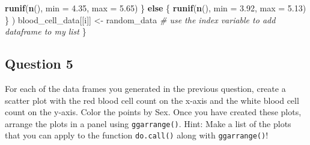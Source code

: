 \documentclass[
]{article}
\newenvironment{Shaded}{\begin{snugshade}}{\end{snugshade}}
\newcommand{\AttributeTok}[1]{\textcolor[rgb]{0.13,0.29,0.53}{#1}}
\newcommand{\CommentTok}[1]{\textcolor[rgb]{0.56,0.35,0.01}{\textit{#1}}}
\newcommand{\ControlFlowTok}[1]{\textcolor[rgb]{0.13,0.29,0.53}{\textbf{#1}}}
\newcommand{\FloatTok}[1]{\textcolor[rgb]{0.00,0.00,0.81}{#1}}
\newcommand{\FunctionTok}[1]{\textcolor[rgb]{0.13,0.29,0.53}{\textbf{#1}}}
\newcommand{\NormalTok}[1]{#1}
\newcommand{\OtherTok}[1]{\textcolor[rgb]{0.56,0.35,0.01}{#1}}
\begin{document}
\begin{Shaded}
\begin{Highlighting}[]
      \FunctionTok{runif}\NormalTok{(}\FunctionTok{n}\NormalTok{(), }\AttributeTok{min =} \FloatTok{4.35}\NormalTok{, }\AttributeTok{max =} \FloatTok{5.65}\NormalTok{)}
\NormalTok{    \} }\ControlFlowTok{else}\NormalTok{ \{}
      \FunctionTok{runif}\NormalTok{(}\FunctionTok{n}\NormalTok{(), }\AttributeTok{min =} \FloatTok{3.92}\NormalTok{, }\AttributeTok{max =} \FloatTok{5.13}\NormalTok{)}
\NormalTok{    \}}
\NormalTok{  )}
\NormalTok{  blood\_cell\_data[[i]] }\OtherTok{\textless{}{-}}\NormalTok{ random\_data }\CommentTok{\# use the index variable to add dataframe to my list}
\NormalTok{\}}
\end{Highlighting}
\end{Shaded}

\subsection{Question 5}\label{question-5}

For each of the data frames you generated in the previous question,
create a scatter plot with the red blood cell count on the x-axis and
the white blood cell count on the y-axis. Color the points by Sex. Once
you have created these plots, arrange the plots in a panel using
\texttt{ggarrange()}. Hint: Make a list of the plots that you can apply
to the function \texttt{do.call()} along with \texttt{ggarrange()}!
\end{document}

